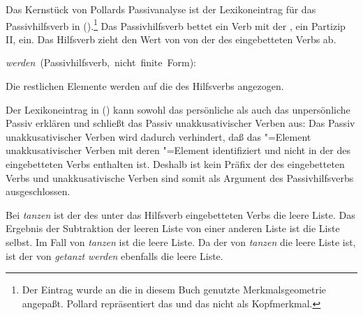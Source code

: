 {Das Kernstück von Pollards Passivanalyse ist der Lexikoneintrag für das Passivhilfsverb in ().\footnote{
        Der Eintrag wurde an die in diesem Buch genutzte Merkmalsgeometrie angepaßt.
        Pollard repräsentiert das \ergm und das \subjm nicht als Kopfmerkmal.%
}
Das Passivhilfsverb bettet ein Verb mit der \vform{} , \dash ein Partizip II, ein.
Das Hilfsverb zieht den Wert von \HPSGerg {} von der \subcatl des eingebetteten Verbs ab.

\eas
\label{le-passiv-prelim-Pollard}
\mbox{\emph{werden} (Passivhilfsverb, nicht finite Form):} \\
\zs

\noindent
Die restlichen Elemente  werden auf die \subcatl des Hilfsverbs angezogen.

Der Lexikoneintrag in () kann sowohl das persönliche als auch das unpersönliche
Passiv erklären und schließt das Passiv unakkusativischer Verben aus:
Das Passiv unakkusativischer Verben wird dadurch verhindert, daß das \HPSGerg"=Element
unakkusativischer Verben mit deren \subj"=Element identifiziert und nicht in der
\subcatl des eingebetteten Verbs enthalten ist. Deshalb ist \HPSGerg kein Präfix
der \subcatl des eingebetteten Verbs und unakkusativische Verben sind somit als
Argument des Passivhilfsverbs ausgeschlossen.

Bei \emph{tanzen} ist der \ergw des unter das Hilfsverb eingebetteten Verbs
die leere Liste. Das Ergebnis der Subtraktion der leeren Liste von einer anderen
Liste ist die Liste selbst. Im Fall von {\em tanzen} ist  die leere Liste.
Da der \ergw von \emph{tanzen} die leere Liste ist, ist der \subjw 
von \emph{getanzt werden} ebenfalls die leere Liste.

}
